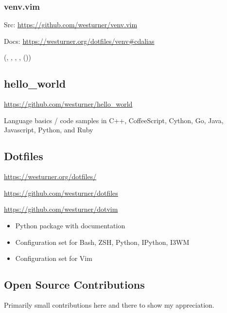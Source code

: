 \documentclass[letter,,openany,oneside]{sphinxhowto}
\begin{document}
\subsubsection{venv.vim}
\label{resume:venv-vim}
\begin{DUlineblock}{0em}
\item[] Src: \url{https://github.com/westurner/venv.vim}
\item[] Docs: \url{https://westurner.org/dotfiles/venv\#cdalias}
\end{DUlineblock}

(, , , , ())


\subsection{hello\_world}
\label{resume:hello-world}
\begin{DUlineblock}{0em}
\item[] \url{https://github.com/westurner/hello\_world}
\end{DUlineblock}

Language basics / code samples in C++, CoffeeScript, Cython,
Go, Java, Javascript, Python, and Ruby


\subsection{Dotfiles}
\label{resume:dotfiles}
\begin{DUlineblock}{0em}
\item[] \url{https://westurner.org/dotfiles/}
\item[] \url{https://github.com/westurner/dotfiles}
\item[] \url{https://github.com/westurner/dotvim}
\end{DUlineblock}
\begin{itemize}
\item {} 
Python package with documentation

\item {} 
Configuration set for Bash, ZSH, Python, IPython, I3WM

\item {} 
Configuration set for Vim

\end{itemize}


\subsection{Open Source Contributions}
\label{resume:open-source-contributions}
Primarily small contributions here and there to show my appreciation.
\end{document}
